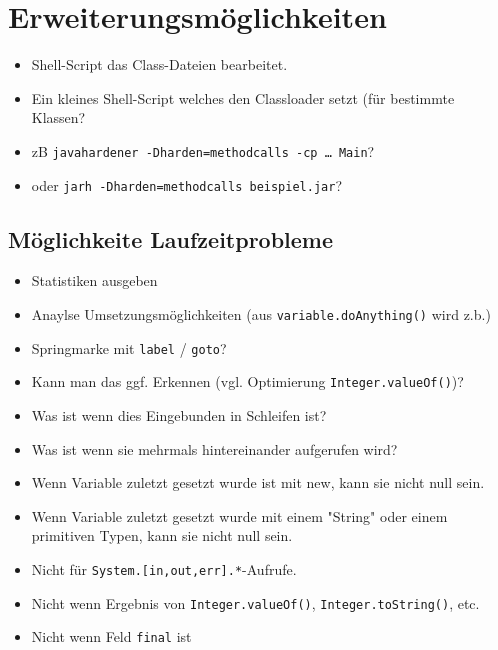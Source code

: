 
\chapter{Erweiterungsmöglichkeiten}

\begin{itemize}
\item Shell-Script das Class-Dateien bearbeitet.
\item Ein kleines Shell-Script welches den Classloader setzt (für bestimmte Klassen?
\item zB \texttt{javahardener -Dharden=methodcalls -cp … Main}?
\item oder \texttt{jarh -Dharden=methodcalls beispiel.jar}?
\end{itemize}

\section{Möglichkeite Laufzeitprobleme}


\begin{itemize}
\item Statistiken ausgeben
\item Anaylse Umsetzungsmöglichkeiten (aus \texttt{variable.doAnything()} wird z.b.)
\item Springmarke mit \texttt{label} / \texttt{goto}?
\item Kann man das ggf. Erkennen (vgl. Optimierung \texttt{Integer.valueOf()})?
\item Was ist wenn dies Eingebunden in Schleifen ist?
\item Was ist wenn sie mehrmals hintereinander aufgerufen wird?
\item Wenn Variable zuletzt gesetzt wurde ist mit new, kann sie nicht null sein.
\item Wenn Variable zuletzt gesetzt wurde mit einem "String" oder einem primitiven Typen, kann sie nicht null sein.
\item Nicht für \texttt{System.[in,out,err].*}-Aufrufe.
\item Nicht wenn Ergebnis von \texttt{Integer.valueOf()}, \texttt{Integer.toString()}, etc.
\item Nicht wenn Feld \texttt{final} ist
\end{itemize}

